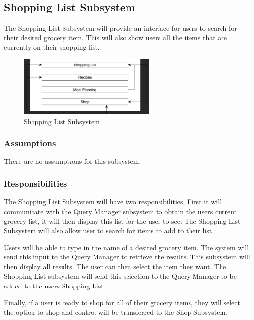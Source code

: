 \subsection{Shopping List Subsystem}
The Shopping List Subsystem will provide an interface for users to search for their desired grocery item. This will also show users all the items that are currently on their shopping list.

\begin{figure}[h!]
	\centering
 	\includegraphics[width=0.60\textwidth]{images/shoppingList}
 \caption{Shopping List Subsystem}
\end{figure}

\subsubsection{Assumptions}
There are no assumptions for this subsystem.

\subsubsection{Responsibilities}
The Shopping List Subsystem will have two responsibilities. First it will communicate with the Query Manager subsystem to obtain the users current grocery list, it will then display this list for the user to see. The Shopping List Subsystem will also allow user to search for items to add to their list. 

Users will be able to type in the name of a desired grocery item. The system will send this input to the Query Manager to retrieve the results. This subsystem will then display all results. The user can then select the item they want. The Shopping List subsystem will send this selection to the Query Manager to be added to the users Shopping List.

Finally, if a user is ready to shop for all of their grocery items, they will select the option to shop and control will be transferred to the Shop Subsystem.

